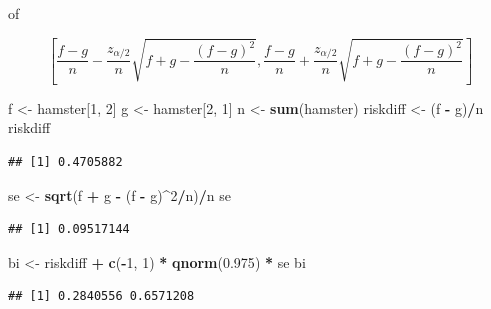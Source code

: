 \documentclass[
  12pt,dutch]{book}
\newenvironment{Shaded}{\begin{snugshade}}{\end{snugshade}}
\newcommand{\DecValTok}[1]{\textcolor[rgb]{0.00,0.00,0.81}{#1}}
\newcommand{\FloatTok}[1]{\textcolor[rgb]{0.00,0.00,0.81}{#1}}
\newcommand{\FunctionTok}[1]{\textcolor[rgb]{0.13,0.29,0.53}{\textbf{#1}}}
\newcommand{\NormalTok}[1]{#1}
\newcommand{\OtherTok}[1]{\textcolor[rgb]{0.56,0.35,0.01}{#1}}
\newcommand{\SpecialCharTok}[1]{\textcolor[rgb]{0.81,0.36,0.00}{\textbf{#1}}}
\theoremstyle{definition}
\theoremstyle{definition}
\theoremstyle{definition}
\theoremstyle{definition}
\theoremstyle{remark}
\begin{document}
of

\[\left[\frac{f-g}{n}-\frac{z_{\alpha/2}}{n}\sqrt{f+g-\frac{(f-g)^2}{n}},\frac{f-g}{n}+\frac{z_{\alpha/2}}{n}\sqrt{f+g-\frac{(f-g)^2}{n}}\right] \]

\begin{Shaded}
\begin{Highlighting}[]
\NormalTok{f }\OtherTok{\textless{}{-}}\NormalTok{ hamster[}\DecValTok{1}\NormalTok{, }\DecValTok{2}\NormalTok{]}
\NormalTok{g }\OtherTok{\textless{}{-}}\NormalTok{ hamster[}\DecValTok{2}\NormalTok{, }\DecValTok{1}\NormalTok{]}
\NormalTok{n }\OtherTok{\textless{}{-}} \FunctionTok{sum}\NormalTok{(hamster)}
\NormalTok{riskdiff }\OtherTok{\textless{}{-}}\NormalTok{ (f }\SpecialCharTok{{-}}\NormalTok{ g)}\SpecialCharTok{/}\NormalTok{n}
\NormalTok{riskdiff}
\end{Highlighting}
\end{Shaded}

\begin{verbatim}
## [1] 0.4705882
\end{verbatim}

\begin{Shaded}
\begin{Highlighting}[]
\NormalTok{se }\OtherTok{\textless{}{-}} \FunctionTok{sqrt}\NormalTok{(f }\SpecialCharTok{+}\NormalTok{ g }\SpecialCharTok{{-}}\NormalTok{ (f }\SpecialCharTok{{-}}\NormalTok{ g)}\SpecialCharTok{\^{}}\DecValTok{2}\SpecialCharTok{/}\NormalTok{n)}\SpecialCharTok{/}\NormalTok{n}
\NormalTok{se}
\end{Highlighting}
\end{Shaded}

\begin{verbatim}
## [1] 0.09517144
\end{verbatim}

\begin{Shaded}
\begin{Highlighting}[]
\NormalTok{bi }\OtherTok{\textless{}{-}}\NormalTok{ riskdiff }\SpecialCharTok{+} \FunctionTok{c}\NormalTok{(}\SpecialCharTok{{-}}\DecValTok{1}\NormalTok{, }\DecValTok{1}\NormalTok{) }\SpecialCharTok{*} \FunctionTok{qnorm}\NormalTok{(}\FloatTok{0.975}\NormalTok{) }\SpecialCharTok{*}\NormalTok{ se}
\NormalTok{bi}
\end{Highlighting}
\end{Shaded}

\begin{verbatim}
## [1] 0.2840556 0.6571208
\end{verbatim}
\end{document}

